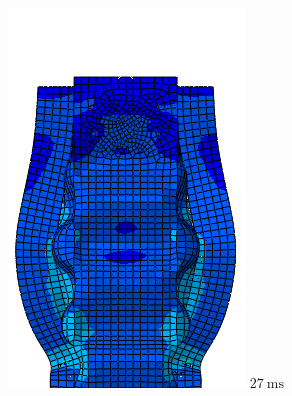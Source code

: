 \documentclass[
documentsize = a4, %
font = cmr, %
typesize = 11, %
printmode = true,
onehalfspacing = true,
language = en, %
titlepage = udciccp, %
degree = pt, %
dedication = true,
acknowledgements = true,
abstract-en = true,
abstract-es = false,
abstract-ga = false,
epigraphs = true,
toc = true,
lof = true,
lot = true,
frontmatterintoc = false,
notation = false,
minimal = false,
]{UDCthesis}
\begin{document}
\begin{figure}
\begin{minipage}[b]{.15\linewidth}
		\includegraphics[width=\linewidth]{IMG_CUTRES/c9}
		$\SI{27}{\ms}$
	\end{minipage}
	\quad
	\begin{minipage}[b]{.15\linewidth}
		\centering

\end{minipage}
\end{figure}
\end{document}
